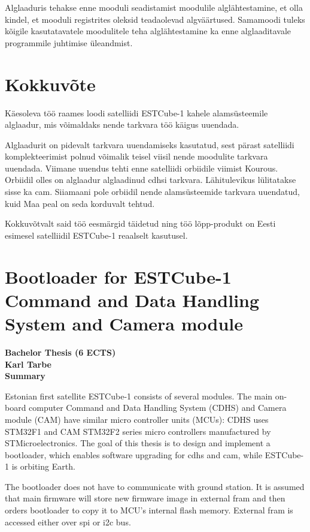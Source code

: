 \documentclass[12pt,a4paper]{article}
\begin{document}
Alglaaduris tehakse enne mooduli seadistamist moodulile alglähtestamine, et olla
kindel, et mooduli registrites oleksid teadaolevad algväärtused. Samamoodi
tuleks kõigile kasutatavatele moodulitele teha alglähtestamine ka enne
alglaaditavale programmile juhtimise üleandmist.

\section{Kokkuvõte}
Käesoleva töö raames loodi satelliidi ESTCube-1 kahele alamsüsteemile alglaadur,
mis võimaldaks nende tarkvara töö käigus uuendada. 

Alglaadurit on pidevalt tarkvara uuendamiseks kasutatud, sest pärast satelliidi
komplekteerimist polnud võimalik teisel viisil nende moodulite tarkvara
uuendada. Viimane uuendus tehti enne satelliidi orbiidile viimist Kourous.
Orbiidil olles on alglaadur alglaadinud \gls{cdhs}i tarkvara.  Lähitulevikus
lülitatakse sisse ka \gls{cam}. Siiamaani pole orbiidil nende alamsüsteemide
tarkvara uuendatud, kuid Maa peal on seda korduvalt tehtud.

Kokkuvõtvalt said töö eesmärgid täidetud ning töö lõpp-produkt on Eesti esimesel
satelliidil ESTCube-1 reaalselt kasutusel.

\newpage
\section*{Bootloader for ESTCube-1 Command and Data Handling System and Camera module}
\begin{center}
\bf Bachelor Thesis (6 ECTS)\\
Karl Tarbe\\
Summary
\end{center}
Estonian first satellite ESTCube-1 consists of several modules. The main
on-board computer Command and Data Handling System (CDHS) and Camera module
(CAM) have similar micro controller units (MCUs): CDHS uses STM32F1 and CAM STM32F2
series micro controllers manufactured by STMicroelectronics.  The goal of this
thesis is to design and implement a bootloader, which enables software upgrading
for \gls{cdhs} and \gls{cam}, while ESTCube-1 is orbiting Earth.

The bootloader does not have to communicate with ground station. It is assumed
that main firmware will store new firmware image in external \gls{fram} and then
orders bootloader to copy it to MCU's internal flash memory. External
\gls{fram} is accessed either over \gls{spi} or \gls{i2c} bus.
\end{document}
